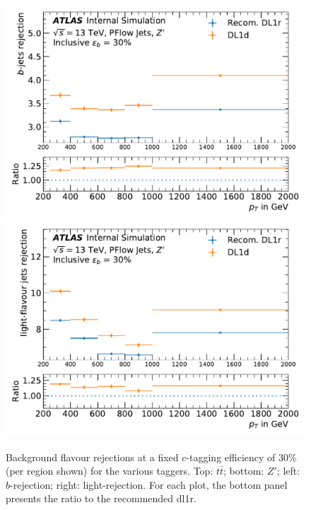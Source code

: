\begin{center}
\begin{figure}[h!]
\centerline{
\includegraphics[scale=0.425]{Images//FTAG/Reprocessed/plotting_eff_vs_pt_c/pT_vs_beff_c_zp_299.pdf}
\includegraphics[scale=0.425]{Images//FTAG/Reprocessed/plotting_eff_vs_pt_c/pT_vs_beff_u_zp_299.pdf}
}
\caption{Background flavour rejections at a fixed $c$-tagging efficiency of 30\% (per region shown) for the various taggers. Top: $t\bar{t}$; bottom: $Z'$; left: $b$-rejection; right: light-rejection. For each plot, the bottom panel presents the ratio to the recommended \gls{dl1r}.}
\label{fig:ptDL1dz}
\end{figure}
\end{center}

